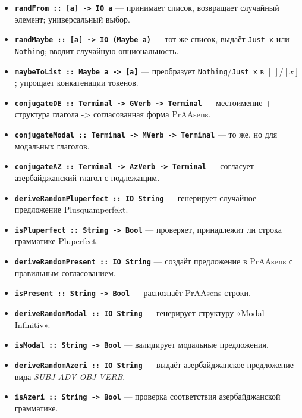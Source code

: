 \documentclass[areasetadvanced]{scrartcl}
\begin{document}
\begin{itemize}
	\item \textbf{\texttt{randFrom :: [a] -> IO a}} — принимает список, возвращает случайный элемент; универсальный выбор.
  
	\item \textbf{\texttt{randMaybe :: [a] -> IO (Maybe a)}} — тот же список, выдаёт \texttt{Just x} или \texttt{Nothing}; вводит случайную опциональность.
  
	\item \textbf{\texttt{maybeToList :: Maybe a -> [a]}} — преобразует \texttt{Nothing}/\texttt{Just x} в \([\,]\)/\([x]\); упрощает конкатенации токенов.
  
	\item \textbf{\texttt{conjugateDE :: Terminal -> GVerb -> Terminal}} — местоимение + структура глагола -> согласованная форма PrAAsens.
  
	\item \textbf{\texttt{conjugateModal :: Terminal -> MVerb -> Terminal}} — то же, но для модальных глаголов.
  
	\item \textbf{\texttt{conjugateAZ :: Terminal -> AzVerb -> Terminal}} — согласует азербайджанский глагол с подлежащим.
  
	\item \textbf{\texttt{deriveRandomPluperfect :: IO String}} — генерирует случайное предложение Plusquamperfekt.
  
	\item \textbf{\texttt{isPluperfect :: String -> Bool}} — проверяет, принадлежит ли строка грамматике Pluperfect.
  
	\item \textbf{\texttt{deriveRandomPresent :: IO String}} — создаёт предложение в PrAAsens с правильным согласованием.
  
	\item \textbf{\texttt{isPresent :: String -> Bool}} — распознаёт PrAAsens‑строки.
  
	\item \textbf{\texttt{deriveRandomModal :: IO String}} — генерирует структуру «Modal + Infinitiv».
  
	\item \textbf{\texttt{isModal :: String -> Bool}} — валидирует модальные предложения.
  
	\item \textbf{\texttt{deriveRandomAzeri :: IO String}} — выдаёт азербайджанское предложение вида \textit{SUBJ ADV OBJ VERB}.
  
	\item \textbf{\texttt{isAzeri :: String -> Bool}} — проверка соответствия азербайджанской грамматике.
  \end{itemize}
  
\end{document}
